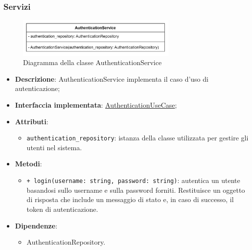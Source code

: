 \subsubsection{Servizi}

 \label{AuthenticationService}
\begin{figure}[H]
    \centering
    \includegraphics[width=0.7\textwidth]{assets/Backend/authentication_service.png}
    \caption{Diagramma della classe AuthenticationService}
  \end{figure}
\begin{itemize}
    \item \textbf{Descrizione}: AuthenticationService implementa il caso d'uso di autenticazione;
    \item \textbf{Interfaccia implementata}: \hyperref[AuthenticationUseCase]{AuthenticationUseCase};
    \item \textbf{Attributi}:
    \begin{itemize}
        \item \texttt{authentication\_repository}: istanza della classe utilizzata per gestire gli utenti nel sistema.
    \end{itemize}
    \item \textbf{Metodi}: 
    \begin{itemize}
        \item \texttt{+ login(username: string, password: string)}: autentica un utente basandosi sullo username e sulla password forniti. Restituisce un oggetto di risposta che include un messaggio di stato e, in caso di successo, il token di autenticazione.
    \end{itemize}
    \item \textbf{Dipendenze}:
    \begin{itemize}
        \item AuthenticationRepository.
    \end{itemize}
\end{itemize}  

